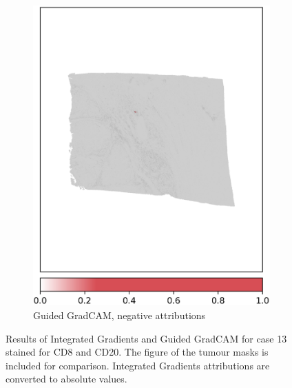 \begin{figure}[h!t]
\begin{subfigure}[b]{0.49\textwidth}
         \includegraphics[width=\textwidth]{latex/captum/case13/guided_gradcam_neg_case13-stain41-dead_2415days.png}
         \caption{Guided GradCAM, negative attributions}
     \end{subfigure}
    \hfill
    \caption[Integrated gradients and Guided GradCAM for case 13  stain 41]{Results of Integrated Gradients and Guided GradCAM for case 13  stained for CD8 and CD20. The figure of the tumour masks is included for comparison. Integrated Gradients attributions are converted to absolute values.}
    \label{fig:case13a}
\end{figure}


